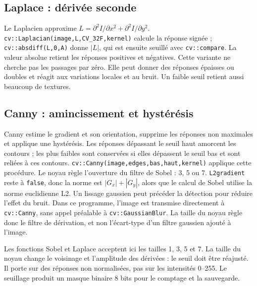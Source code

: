 \documentclass[a4paper,11pt]{article}
\begin{document}
\subsection{Laplace : dérivée seconde}
Le Laplacien approxime $L=\partial^2I/\partial x^2+\partial^2I/\partial y^2$.
\texttt{cv::Laplacian(image,L,CV\_32F,kernel)} calcule la réponse signée ;
\texttt{cv::absdiff(L,0,A)} donne $|L|$, qui est ensuite seuillé avec
\texttt{cv::compare}. La valeur absolue retient les réponses positives et négatives.
Cette variante ne cherche pas les passages par zéro. Elle peut donner des
réponses épaisses ou doubles et réagit aux variations locales et au bruit.
Un faible seuil retient aussi beaucoup de textures.

\subsection{Canny : amincissement et hystérésis}
Canny estime le gradient et son orientation, supprime les réponses non maximales
et applique une hystérésis. Les réponses dépassant le seuil haut amorcent les
contours ; les plus faibles sont conservées si elles dépassent le seuil bas
et sont reliées à ces contours.
\texttt{cv::Canny(image,edges,bas,haut,kernel)} applique cette procédure.
Le noyau règle l'ouverture du filtre de Sobel : 3, 5 ou 7.
\texttt{L2gradient} reste à \texttt{false}, donc la norme est $|G_x|+|G_y|$,
alors que le calcul de Sobel utilise la norme euclidienne L2.
Un lissage gaussien peut précéder la détection pour réduire l'effet du bruit.
Dans ce programme, l'image est transmise directement à \texttt{cv::Canny},
sans appel préalable à \texttt{cv::GaussianBlur}.
La taille du noyau règle donc le filtre de dérivation, et non l'écart-type
d'un filtre gaussien ajouté à l'image.

Les fonctions Sobel et Laplace acceptent ici les tailles 1, 3, 5 et 7.
La taille du noyau change le voisinage
et l'amplitude des dérivées : le seuil doit être réajusté. Il porte sur des
réponses non normalisées, pas sur les intensités 0--255.
Le seuillage produit un masque binaire 8 bits pour le comptage et la sauvegarde.
\end{document}
